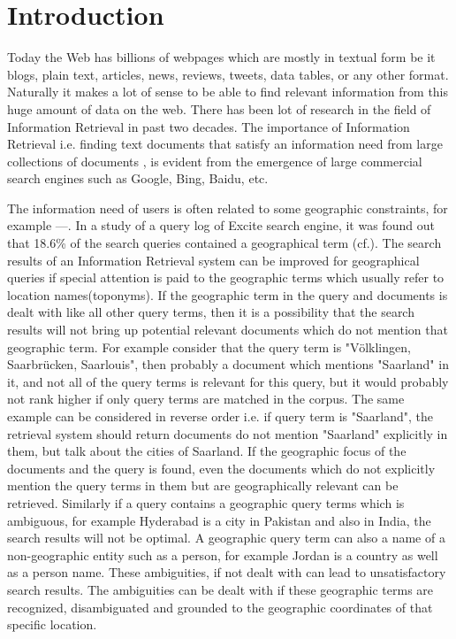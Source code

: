 \documentclass[
     11pt,         %
     a4paper,      %
     oneside,
     ]{article}
\begin{document}
\tableofcontents
\newpage





\section{Introduction}\label{sec:introduction}
Today the Web has billions of webpages which are mostly in textual form be it blogs, plain text, articles, news, reviews, tweets, data tables, or any other format. Naturally it makes a lot of sense to be able to find relevant information from this huge amount of data on the web. There has been lot of research in the field of Information Retrieval in past two decades. The importance of Information Retrieval i.e. finding text documents that satisfy an information need from large collections of documents \cite{Manning:2008:IIR:1394399}, is evident from the emergence of large commercial search engines such as Google, Bing, Baidu, etc.

The information need of users is often related to some geographic constraints, for example ---. In a study of a query log of Excite search engine, it was found out that 18.6\% of the search queries contained a geographical term \cite{Sanderson04analyzinggeographic} (cf.\cite{Leidner:2008:PhD}). The search results of an Information Retrieval system can be improved for geographical queries if special attention is paid to the geographic terms which usually refer to location names(toponyms). If the geographic term in the query and documents is dealt with like all other query terms, then it is a possibility that the search results will not bring up potential relevant documents which do not mention that geographic term. For example consider that the query term is "Völklingen, Saarbrücken, Saarlouis", then probably a document which mentions "Saarland" in it, and not all of the query terms is relevant for this query, but it would probably not rank higher if only query terms are matched in the corpus. The same example can be considered in reverse order i.e. if query term is "Saarland", the retrieval system should return documents do not mention "Saarland" explicitly in them, but talk about the cities of Saarland. If the geographic focus of the documents and the query is found, even the documents which do not explicitly mention the query terms in them but are geographically relevant can be retrieved. Similarly if a query contains a geographic query terms which is ambiguous, for example Hyderabad is a city in Pakistan and also in India, the search results will not be optimal. A geographic query term can also a name of a non-geographic entity such as a person, for example Jordan is a country as well as a person name. These ambiguities, if not dealt with can lead to unsatisfactory search results. The ambiguities can be dealt with if these geographic terms are recognized, disambiguated and grounded to the geographic coordinates of that specific location. 
\end{document}
